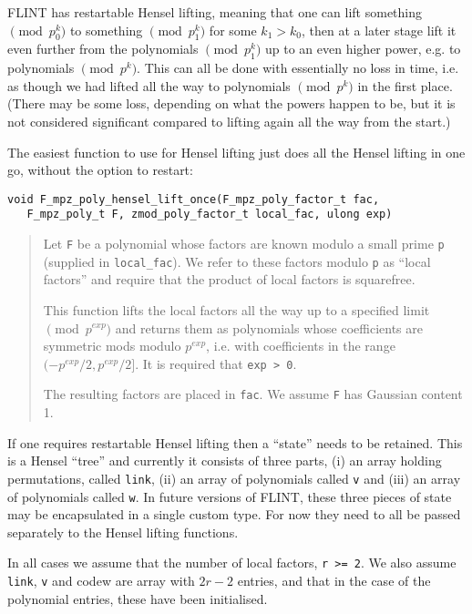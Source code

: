 \documentclass[a4paper,10pt]{article}
\newcommand{\code}{\lstinline}
\begin{document}
FLINT has restartable Hensel lifting, meaning that one can lift something $\pmod{p^k_0}$ to something
$\pmod{p^k_1}$ for some $k_1 > k_0$, then at a later stage lift it even further from the polynomials
$\pmod{p^k_1}$ up to an even higher power, e.g. to polynomials $\pmod{p^k}$. This can all be done with
essentially no loss in time, i.e. as though we had lifted all the way to polynomials $\pmod{p^k}$ in 
the first place. (There may be some loss, depending on what the powers happen to be, but it is not 
considered significant compared to lifting again all the way from the start.)

The easiest function to use for Hensel lifting just does all the Hensel lifting in one go, without the
option to restart:

\begin{lstlisting}
void F_mpz_poly_hensel_lift_once(F_mpz_poly_factor_t fac, 
   F_mpz_poly_t F, zmod_poly_factor_t local_fac, ulong exp)
\end{lstlisting}
\begin{quote}
Let \code{F} be a polynomial whose factors are known modulo a small prime \code{p} (supplied in 
\code{local_fac}). We refer to these factors modulo \code{p} as ``local factors'' and require that the 
product of local factors is squarefree. 

This function lifts the local factors all the way up to a specified limit $\pmod{p^{exp}}$ and returns
them as polynomials whose coefficients are symmetric mods modulo $p^{exp}$, i.e. with coefficients in 
the range $(-p^{exp}/2, p^{exp}/2]$. It is required that \code{exp > 0}.

The resulting factors are placed in \code{fac}. We assume \code{F} has Gaussian content 1. 
\end{quote}

If one requires restartable Hensel lifting then a ``state'' needs to be retained. This is a Hensel 
``tree'' and currently it consists of three parts, (i) an array holding permutations, called \code{link},
(ii) an array of polynomials called \code{v} and (iii) an array of polynomials called \code{w}. In 
future versions of FLINT, these three pieces of state may be encapsulated in a single custom type. For
now they need to all be passed separately to the Hensel lifting functions.

In all cases we assume that the number of local factors, \code{r >= 2}. We also assume \code{link}, 
\code{v} and code{w} are array with $2r - 2$ entries, and that in the case of the polynomial entries,
these have been initialised.
\end{document}
